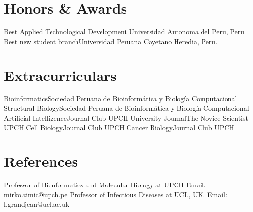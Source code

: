 \documentclass[11pt,a4paper,sans]{moderncv}
\begin{document}
\section{Honors \& Awards}
  {Best Applied Technological Development}
  {Universidad Autonoma del Peru, Peru}{}
  {}
  {Best new student branch}{Universidad Peruana Cayetano Heredia, Peru.}{}
  {}

\section{Extracurriculars}

    {Bioinformatics}{Sociedad Peruana de Bioinformática y Biología Computacional}{}
    {}
    {Structural Biology}{Sociedad Peruana de Bioinformática y Biología Computacional}{}
    {}
    {Artificial Intelligence}{Journal Club UPCH}{}
    {}
    {University Journal}{The Novice Scientist UPCH}{}
    {}
    {Cell Biology}{Journal Club UPCH}{}
    {}
    {Cancer Biology}{Journal Club UPCH}{}
    {}
  

\section{References}
    {Professor of Bionformatics and Molecular Biology at UPCH}{}{}
    {Email: mirko.zimic@upch.pe}
    {Professor of Infectious Diseases at UCL, UK.}{}{}
    {Email: l.grandjean@ucl.ac.uk}

\end{document}
